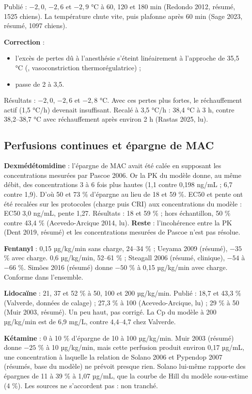 \documentclass[10pt,a4paper]{article}
\newcommand{\vp}[1]{\path{#1}}
\begin{document}
Publié : $-2{,}0$, $-2{,}6$ et $-2{,}9$ °C à 60, 120 et 180 min (Redondo 2012, résumé, 1525 chiens). La température chute vite, puis plafonne après 60 min (Sage 2023, résumé, 1097 chiens).

\textbf{Correction} :
\begin{itemize}
\item l'excès de pertes dû à l'anesthésie s'éteint linéairement à l'approche de 35,5 °C (\vp{vasoconstriction_c}, vasoconstriction thermorégulatrice) ;
\item \vp{loss_gain_anesth} passe de 2 à 3,5.
\end{itemize}

Résultats : $-2{,}0$, $-2{,}6$ et $-2{,}8$ °C. Avec ces pertes plus fortes, le réchauffement actif (1,5 °C/h) devenait insuffisant. Recalé à 3,5 °C/h : 38,4 °C à 3 h, contre 38,2–38,7 °C avec réchauffement après environ 2 h (Rastas 2025, lu).

\subsection{Perfusions continues et épargne de MAC}
\textbf{Dexmédétomidine} : l'épargne de MAC avait été calée en supposant les concentrations mesurées par Pascoe 2006. Or la PK du modèle donne, au même débit, des concentrations 3 à 6 fois plus hautes (1,1 contre 0,198 ng/mL ; 6,7 contre 1,9). D'où 50 et 73 \% d'épargne au lieu de 18 et 59 \%. EC50 et pente ont été recalées sur les protocoles (charge puis CRI) aux concentrations du modèle : EC50 3,0 ng/mL, pente 1,27. Résultats : 18 et 59 \% ; hors échantillon, 50 \% contre 43,4 \% (Acevedo-Arcique 2014, lu). \textbf{Reste} : l'incohérence entre la PK (Dent 2019, résumé) et les concentrations mesurées de Pascoe n'est pas résolue.

\textbf{Fentanyl} : 0,15 µg/kg/min sans charge, 24–34 \% ; Ueyama 2009 (résumé), $-35$ \% avec charge. 0,6 µg/kg/min, 52–61 \% ; Steagall 2006 (résumé, clinique), $-54$ à $-66$ \%. Simões 2016 (résumé) donne $-50$ \% à 0,15 µg/kg/min avec charge. Conforme dans l'ensemble.

\textbf{Lidocaïne} : 21, 37 et 52 \% à 50, 100 et 200 µg/kg/min. Publié : 18,7 et 43,3 \% (Valverde, données de calage) ; 27,3 \% à 100 (Acevedo-Arcique, lu) ; 29 \% à 50 (Muir 2003, résumé). Un peu haut, pas corrigé. La Cp du modèle à 200 µg/kg/min est de 6,9 mg/L, contre 4,4–4,7 chez Valverde.

\textbf{Kétamine} : 0 à 10 \% d'épargne de 10 à 100 µg/kg/min. Muir 2003 (résumé) donne $-25$ \% à 10 µg/kg/min, mais cette perfusion produit environ 0,17 µg/mL, une concentration à laquelle la relation de Solano 2006 et Pypendop 2007 (résumés, base du modèle) ne prévoit presque rien. Solano lui-même rapporte des épargnes de 11 à 39 \% à 1,07 µg/mL, que la courbe de Hill du modèle sous-estime (4 \%). Les sources ne s'accordent pas : non tranché.
\end{document}
